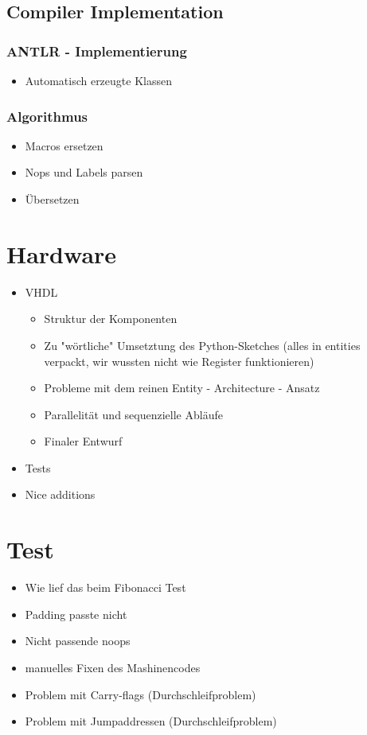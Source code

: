 \documentclass[paper=a4,fontsize=10pt]{scrreprt}
\begin{document}
\section{Compiler Implementation}
\subsection{ANTLR - Implementierung}
\begin{itemize}
    \item Automatisch erzeugte Klassen
\end{itemize}

\subsection{Algorithmus}
\begin{itemize}
    \item Macros ersetzen
    \item Nops und Labels parsen
    \item Übersetzen
\end{itemize}

\chapter{Hardware}

\begin{itemize}
    \item VHDL
    \begin{itemize}
        \item Struktur der Komponenten
        \item Zu "wörtliche" Umsetztung des Python-Sketches (alles in entities verpackt, wir wussten nicht wie Register funktionieren)
        \item Probleme mit dem reinen Entity - Architecture - Ansatz
        \item Parallelität und sequenzielle Abläufe
        \item Finaler Entwurf
    \end{itemize}
    \item Tests
    \item Nice additions
\end{itemize}

\chapter{Test}
\begin{itemize}
    \item Wie lief das beim Fibonacci Test
    \item Padding passte nicht
    \item Nicht passende noops
    \item manuelles Fixen des Mashinencodes
    \item Problem mit Carry-flags (Durchschleifproblem)
    \item Problem mit Jumpaddressen (Durchschleifproblem)
\end{itemize}
\end{document}

